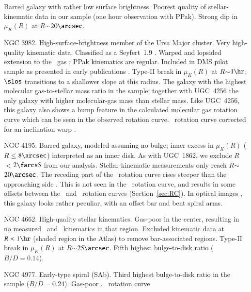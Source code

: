 \documentclass[traditabstract]{aa} %
\begin{document}
{\begin{list}{}
%
  \item[{\bf UGC  6903:}] Barred galaxy with rather low surface brightness. Poorest
  quality of stellar-kinematic data in our sample (one hour observation with PPak).
  Strong dip in $\mu_K(R)$ at $R$$\sim$$20\arcsec$.
%
  \item[{\bf UGC  6918:}] NGC 3982.  High-surface-brightness member of the Ursa
  Major cluster.  Very high-quality kinematic data. Classified as a Seyfert~1.9 
  \citep{veron2006}. Warped and lopsided extension to the \hone\ gas
  \citep{martinsson2011}; PPak kinematics are regular. Included in DMS pilot sample as
  presented in early publications \citep{verheyen2004,bershady2005,westfall2009}.
  Type-II break in $\mu_K(R)$ at $R$$\sim$$1\hr$; $\slos$ transitions to a shallower
  slope at this radius. The galaxy with the highest molecular gas-to-stellar mass ratio
  in the sample; together with UGC~4256 the only galaxy with higher molecular-gas mass
  than stellar mass. Like UGC~4256, this galaxy also shows a bump feature in the 
  calculated molecular gas rotation curve which can be seen in the observed rotation
  curve. \hone\ rotation curve corrected for an inclination warp \citep{martinsson2011}.
%
  \item[{\bf UGC  7244:}] NGC 4195. Barred galaxy, modeled assuming no bulge; inner excess
  in $\mu_K(R)$ ($R$$\leq$$8\arcsec$) interpreted as an inner disk. As with UGC~1862, we
  exclude $R$$<$$2\farcs5$ from our analysis. Stellar-kinematic measurements only reach
  $R$$\sim$$20\arcsec$.
  The receding part of the \hone\ rotation curve rises steeper than the approaching side
  \citep{martinsson2011}. This is not seen in the \halp\ rotation curve, and results in
  some offsets between the \hone\ and \halp\ rotation curves (Section~\ref{sec:RC}).
  In optical images , this galaxy looks rather peculiar, with an
  offset bar and bent spiral arms. 
%
  \item[{\bf UGC  7917:}] NGC 4662.  High-quality stellar kinematics. Gas-poor in the
  center, resulting in no measured \halp\ and \hone\ kinematics in that region.
  Excluded kinematic data at $R<1\hr$ (shaded region in the Atlas) to remove
  bar-associated regions. Type-II break in $\mu_K(R)$ at $R$$\sim$$25\arcsec$.
  Fifth highest bulge-to-disk ratio ($B/D=0.14$).
%
  \item[{\bf UGC  8196:}]  NGC 4977. Early-type spiral (SAb). Third highest bulge-to-disk
  ratio in the sample ($B/D$$=$0.24).
  Gas-poor \citep[][]{martinsson2011}. \hone\ rotation curve
$$
\end{list}}
\end{document}
